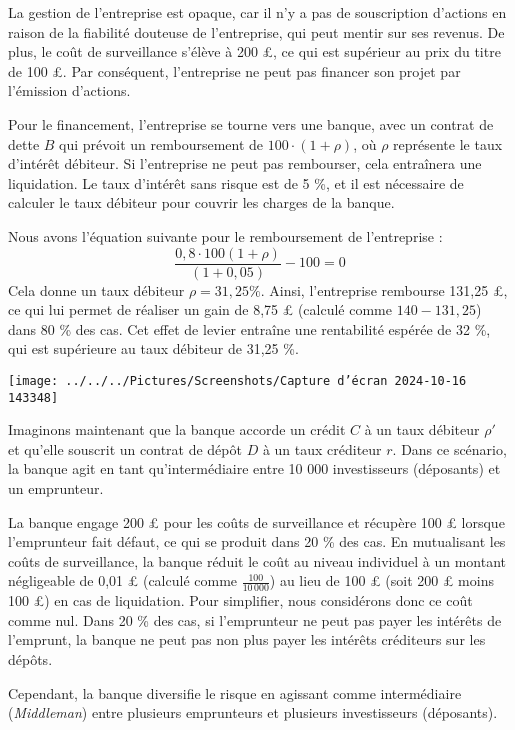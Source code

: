 \documentclass[a4paper, 12pt]{report}
\begin{document}
La gestion de l’entreprise est opaque, car il n’y a pas de souscription d’actions en raison de la fiabilité douteuse de l’entreprise, qui peut mentir sur ses revenus. De plus, le coût de surveillance s'élève à 200 £, ce qui est supérieur au prix du titre de 100 £. Par conséquent, l’entreprise ne peut pas financer son projet par l’émission d’actions. 

Pour le financement, l’entreprise se tourne vers une banque, avec un contrat de dette \( B \) qui prévoit un remboursement de \( 100 \cdot (1+\rho) \), où \( \rho \) représente le taux d’intérêt débiteur. Si l’entreprise ne peut pas rembourser, cela entraînera une liquidation. Le taux d’intérêt sans risque est de 5 \%, et il est nécessaire de calculer le taux débiteur pour couvrir les charges de la banque.

Nous avons l'équation suivante pour le remboursement de l'entreprise : 
\[
\frac{0,8 \cdot 100(1+\rho)}{(1+0,05)}-100=0
\]
Cela donne un taux débiteur \( \rho = 31,25 \% \). Ainsi, l'entreprise rembourse 131,25 £, ce qui lui permet de réaliser un gain de 8,75 £ (calculé comme \( 140 - 131,25 \)) dans 80 \% des cas. Cet effet de levier entraîne une rentabilité espérée de 32 \%, qui est supérieure au taux débiteur de 31,25 \%.

\begin{center}
	\texttt{[image: ../../../Pictures/Screenshots/Capture d'écran 2024-10-16 143348]}
\end{center}

Imaginons maintenant que la banque accorde un crédit \( C \) à un taux débiteur \( \rho' \) et qu'elle souscrit un contrat de dépôt \( D \) à un taux créditeur \( r \). Dans ce scénario, la banque agit en tant qu'intermédiaire entre 10 000 investisseurs (déposants) et un emprunteur.

La banque engage 200 £ pour les coûts de surveillance et récupère 100 £ lorsque l’emprunteur fait défaut, ce qui se produit dans 20 \% des cas. En mutualisant les coûts de surveillance, la banque réduit le coût au niveau individuel à un montant négligeable de 0,01 £ (calculé comme \( \frac{100}{10\,000} \)) au lieu de 100 £ (soit 200 £ moins 100 £) en cas de liquidation. Pour simplifier, nous considérons donc ce coût comme nul. Dans 20 \% des cas, si l’emprunteur ne peut pas payer les intérêts de l’emprunt, la banque ne peut pas non plus payer les intérêts créditeurs sur les dépôts. 

Cependant, la banque diversifie le risque en agissant comme intermédiaire (\textit{Middleman}) entre plusieurs emprunteurs et plusieurs investisseurs (déposants).
\end{document}
